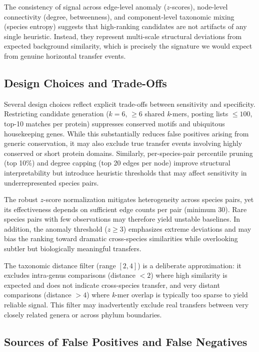 \documentclass[11pt]{article}
\begin{document}
The consistency of signal across edge-level anomaly ($z$-scores), node-level connectivity (degree, betweenness), and component-level taxonomic mixing (species entropy) suggests that high-ranking candidates are not artifacts of any single heuristic. Instead, they represent multi-scale structural deviations from expected background similarity, which is precisely the signature we would expect from genuine horizontal transfer events.

\subsection{Design Choices and Trade-Offs}

Several design choices reflect explicit trade-offs between sensitivity and specificity. Restricting candidate generation ($k=6$, $\ge 6$ shared \textit{k}-mers, posting lists $\le 100$, top-10 matches per protein) suppresses conserved motifs and ubiquitous housekeeping genes. While this substantially reduces false positives arising from generic conservation, it may also exclude true transfer events involving highly conserved or short protein domains. Similarly, per-species-pair percentile pruning (top 10\%) and degree capping (top 20 edges per node) improve structural interpretability but introduce heuristic thresholds that may affect sensitivity in underrepresented species pairs.

The robust $z$-score normalization mitigates heterogeneity across species pairs, yet its effectiveness depends on sufficient edge counts per pair (minimum 30). Rare species pairs with few observations may therefore yield unstable baselines. In addition, the anomaly threshold ($z \ge 3$) emphasizes extreme deviations and may bias the ranking toward dramatic cross-species similarities while overlooking subtler but biologically meaningful transfers.

The taxonomic distance filter (range $[2,4]$) is a deliberate approximation: it excludes intra-genus comparisons (distance $< 2$) where high similarity is expected and does not indicate cross-species transfer, and very distant comparisons (distance $> 4$) where \textit{k}-mer overlap is typically too sparse to yield reliable signal. This filter may inadvertently exclude real transfers between very closely related genera or across phylum boundaries.

\subsection{Sources of False Positives and False Negatives}
\end{document}
